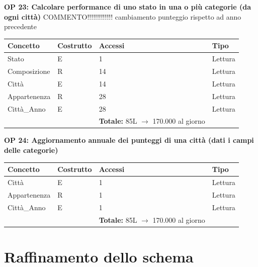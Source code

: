 \documentclass[a4paper,12pt]{report}
\begin{document}
            \textbf{OP 23: Calcolare performance di uno stato in una o più categorie (da ogni città)}
            COMMENTO!!!!!!!!!!!!! cambiamento punteggio rispetto ad anno precedente
        	\begin{table}[H]
            \centering
             \begin{tabular}{llll}
             \rowcolor{yellow!20} \textbf{Concetto} & \textbf{Costrutto} & \textbf{Accessi} & \textbf{Tipo}\\ [0.5ex] 
             \hline
             Stato & E & 1 & Lettura \\ 
             Composizione & R & 14 & Lettura \\ 
             Città & E & 14 & Lettura \\ 
             Appartenenza & R & 28 & Lettura \\ 
             Città\_Anno & E & 28 & Lettura \\ 
             \hline
                \rowcolor{yellow!20} &   & \textbf{Totale:} 85L $\rightarrow$ 170.000 al giorno &  \\ [1ex] 
             
             \end{tabular}
            \end{table}

            \textbf{OP 24: Aggiornamento annuale dei punteggi di una città (dati i campi delle categorie)}
        	\begin{table}[H]
            \centering
             \begin{tabular}{llll}
             \rowcolor{yellow!20} \textbf{Concetto} & \textbf{Costrutto} & \textbf{Accessi} & \textbf{Tipo}\\ [0.5ex] 
             \hline
             Città & E & 1 & Lettura \\ 
             Appartenenza & R & 1 & Lettura \\ 
             Città\_Anno & E & 1 & Lettura \\ 
             \hline
                \rowcolor{yellow!20} &   & \textbf{Totale:} 85L $\rightarrow$ 170.000 al giorno &  \\ [1ex] 
             
             \end{tabular}
            \end{table}
        
        \section{Raffinamento dello schema}
\end{document}
